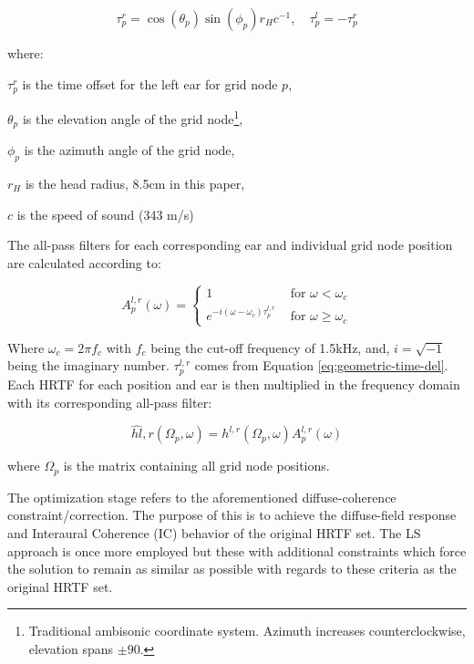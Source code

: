 \begin{equation}
\tau_{p}^{r}=\cos \left(\theta_{p}\right) \sin \left(\phi_{p}\right) r_{H} c^{-1}, \quad \tau_{p}^{l}=-\tau_{p}^{r}
\label{eq:geometric-time-del}
\end{equation}

\noindent where:
\begin{description}
\item $\tau_{p}^{r}$ is the time offset for the left ear for grid node $p$,
\item $\theta_{p}$ is the elevation angle of the grid node\footnote{Traditional ambisonic coordinate system. Azimuth increases counterclockwise, elevation spans $\pm90$\textdegree.},
\item $\phi_{p}$ is the azimuth angle of the grid node,
\item $r_{H}$ is the head radius, 8.5cm in this paper,
\item $c$ is the speed of sound (343 m/s)
\end{description}

The all-pass filters for each corresponding ear and individual grid node position are calculated according to:

\begin{equation}
A_{p}^{l, r}(\omega)=\left\{\begin{array}{ll}
1 & \text { for } \omega<\omega_{c} \\
e^{-i\left(\omega-\omega_{c}\right) \tau_{p}^{l, r}} & \text { for } \omega \geq \omega_{c}
\end{array}\right.
\end{equation}

Where $\omega_{c} = 2 \pi f_{c}$ with $f_{c}$ being the cut-off frequency of 1.5kHz, and, $i = \sqrt{-1}$ being the imaginary number. $\tau_{p}^{l, r}$ comes from Equation \ref{eq:geometric-time-del}. Each HRTF for each position and ear is then multiplied in the frequency domain with its corresponding all-pass filter:

\begin{equation}
\hat{h l}, r\left(\Omega_{p}, \omega\right)=h^{l, r}\left(\Omega_{p}, \omega\right) A_{p}^{l, r}(\omega)
\end{equation}

where $\Omega_{p}$ is the matrix containing all grid node positions. 

The optimization stage refers to the aforementioned diffuse-coherence constraint/correction. The purpose of this is to achieve the diffuse-field response and Interaural Coherence (IC) behavior of the original HRTF set. The LS approach is once more employed but these with additional constraints which force the solution to remain as similar as possible with regards to these criteria as the original HRTF set.

